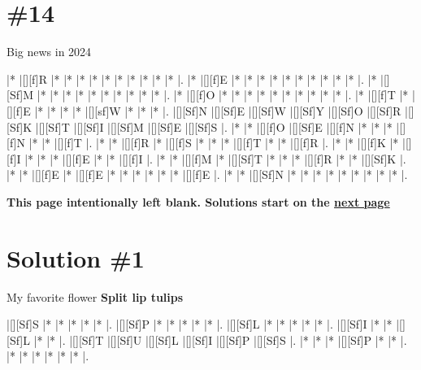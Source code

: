 \documentclass[letterpaper]{article}
\begin{document}
\section*{\#14}
Big news in 2024

\vspace*{1em}
\begin{Puzzle}{12}{12}
|*        |[][f]R   |*        |*        |*        |*        |*        |*        |*        |*        |*        |*        |.
|*        |[][f]E   |*        |*        |*        |*        |*        |*        |*        |*        |*        |*        |.
|*        |[][Sf]M  |*        |*        |*        |*        |*        |*        |*        |*        |*        |*        |.
|*        |[][f]O   |*        |*        |*        |*        |*        |*        |*        |*        |*        |*        |.
|*        |[][f]T   |*        |[][f]E   |*        |*        |*        |*        |[][sf]W  |*        |*        |*        |.
|[][Sf]N  |[][Sf]E  |[][Sf]W  |[][Sf]Y  |[][Sf]O  |[][Sf]R  |[][Sf]K  |[][Sf]T  |[][Sf]I  |[][Sf]M  |[][Sf]E  |[][Sf]S  |.
|*        |*        |[][f]O   |[][Sf]E  |[][f]N   |*        |*        |*        |[][f]N   |*        |*        |[][f]T   |.
|*        |*        |[][f]R   |*        |[][f]S   |*        |*        |*        |[][f]T   |*        |*        |[][f]R   |.
|*        |*        |[][f]K   |*        |[][f]I   |*        |*        |*        |[][f]E   |*        |*        |[][f]I   |.
|*        |*        |[][f]M   |*        |[][Sf]T  |*        |*        |*        |[][f]R   |*        |*        |[][Sf]K  |.
|*        |*        |[][f]E   |*        |[][f]E   |*        |*        |*        |*        |*        |*        |[][f]E   |.
|*        |*        |[][Sf]N  |*        |*        |*        |*        |*        |*        |*        |*        |*        |.
\end{Puzzle}

\newpage
\begin{center}
\textbf{This page intentionally left blank. Solutions start on the \hyperlink{solstart}{next page}}
\end{center}

\newpage

\hypertarget{solstart}{}
\section*{Solution \#1}
My favorite flower
\newline\textbf{Split lip tulips}

\vspace*{1em}
\begin{Puzzle}{6}{7}
|[][Sf]S  |*        |*        |*        |*        |*        |. 
|[][Sf]P  |*        |*        |*        |*        |*        |.  
|[][Sf]L  |*        |*        |*        |*        |*        |.
|[][Sf]I  |*        |*        |[][Sf]L  |*        |*        |.  
|[][Sf]T  |[][Sf]U  |[][Sf]L  |[][Sf]I  |[][Sf]P  |[][Sf]S  |.
|*        |*        |*        |[][Sf]P  |*        |*        |. 
|*        |*        |*        |*        |*        |*        |.
\end{Puzzle}
\end{document}
